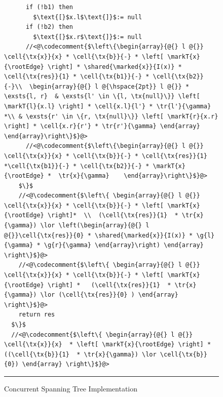 \begin{figure}
\begin{lstlisting}
      if (!b1) then 
        $\text{[}$x.l$\text{]}$:= null
      if (!b2) then 
        $\text{[}$x.r$\text{]}$:= null
      //<@\codecomment{$\left\{\begin{array}{@{} l @{}}  \cell{\tx{x}}{x} * \cell{\tx{b}}{-} * \left[ \markT{x}{\rootEdge} \right] * \shared{\marked{x}}{I(x)} * \cell{\tx{res}}{1} * \cell{\tx{b1}}{-} * \cell{\tx{b2}}{-}\\  \begin{array}{@{} l @{\hspace{2pt}} l @{}} * \exsts{l, r}  & \exsts{l' \in \{l, \tx{null}\}} \left[ \markT{l}{x.l} \right] * \cell{x.l}{l'} * \tr{l'}{\gamma} *\\ & \exsts{r' \in \{r, \tx{null}\}} \left[ \markT{r}{x.r} \right] * \cell{x.r}{r'} * \tr{r'}{\gamma} \end{array} \end{array}\right\}$}@>
      //<@\codecomment{$\left\{\begin{array}{@{} l @{}}  \cell{\tx{x}}{x} * \cell{\tx{b}}{-} * \cell{\tx{res}}{1} *\cell{\tx{b1}}{-} * \cell{\tx{b2}}{-} * \markT{x}{\rootEdge} *  \tr{x}{\gamma}    \end{array}\right\}$}@>
    $\}$    
    //<@\codecomment{$\left\{ \begin{array}{@{} l @{}} \cell{\tx{x}}{x} * \cell{\tx{b}}{-} * \left[ \markT{x}{\rootEdge} \right]*  \\  (\cell{\tx{res}}{1}  * \tr{x}{\gamma}) \lor \left(\begin{array}{@{} l @{}}\cell{\tx{res}}{0} * \shared{\marked{x}}{I(x)} * \g{l}{\gamma} * \g{r}{\gamma} \end{array}\right) \end{array} \right\}$}@>
    //<@\codecomment{$\left\{ \begin{array}{@{} l @{}} \cell{\tx{x}}{x} * \cell{\tx{b}}{-} * \left[ \markT{x}{\rootEdge} \right] *   (\cell{\tx{res}}{1}  * \tr{x}{\gamma}) \lor (\cell{\tx{res}}{0} ) \end{array} \right\}$}@>
    return res
  $\}$
  //<@\codecomment{$\left\{ \begin{array}{@{} l @{}} \cell{\tx{x}}{x}  * \left[ \markT{x}{\rootEdge} \right] *  ((\cell{\tx{b}}{1}  * \tr{x}{\gamma}) \lor \cell{\tx{b}}{0}) \end{array} \right\}$}@>
\end{lstlisting}
\hrule\vspace*{-6pt}
\caption{Concurrent Spanning Tree Implementation}
\label{fig:conSpanningTree}
\end{figure}
%
%
\vspace{-2ex}

